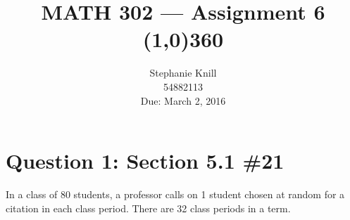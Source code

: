 \documentclass[11pt, oneside]{article}   	%
\begin{document}
\title{MATH 302 --- Assignment 6 \\
\line(1,0){360} \\              %
}
\author{
Stephanie Knill \\
54882113 \\
Due: March 2, 2016}

\date{}                   %
\maketitle




\section*{Question 1: Section 5.1 \#21}

In a class of 80 students, a professor calls on 1 student chosen at random for a citation in each class period. There are 32 class periods in a term.
\end{document}
